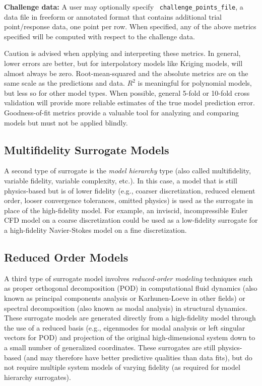 {\bf Challenge data:} A user may optionally specify {\tt
  challenge\_points\_file}, a data file in freeform or annotated
format that contains additional trial point/response data, one point
per row.  When specified, any of the above metrics specified will be
computed with respect to the challenge data.

Caution is advised when applying and interpreting these metrics.  In
general, lower errors are better, but for interpolatory models like
Kriging models, will almost always be zero.  Root-mean-squared and the
absolute metrics are on the same scale as the predictions and data.
$R^2$ is meaningful for polynomial models, but less so for other model
types.  When possible, general 5-fold or 10-fold cross validation will
provide more reliable estimates of the true model prediction
error. Goodness-of-fit metrics provide a valuable tool for analyzing
and comparing models but must not be applied blindly.


\subsection{Multifidelity Surrogate Models} \label{models:surrogate:multifid}

A second type of surrogate is the {\em model hierarchy} type (also
called multifidelity, variable fidelity, variable complexity, etc.).
In this case, a model that is still physics-based but is of lower
fidelity (e.g., coarser discretization, reduced element order, looser
convergence tolerances, omitted physics) is used as the surrogate in
place of the high-fidelity model.  For example, an inviscid,
incompressible Euler CFD model on a coarse discretization could be
used as a low-fidelity surrogate for a high-fidelity Navier-Stokes
model on a fine discretization.

\subsection{Reduced Order Models} \label{models:surrogate:rom}

A third type of surrogate model involves {\em reduced-order modeling}
techniques such as proper orthogonal decomposition (POD) in
computational fluid dynamics (also known as principal components
analysis or Karhunen-Loeve in other fields) or spectral decomposition
(also known as modal analysis) in structural dynamics.  These
surrogate models are generated directly from a high-fidelity model
through the use of a reduced basis (e.g., eigenmodes for modal
analysis or left singular vectors for POD) and projection of the
original high-dimensional system down to a small number of generalized
coordinates.  These surrogates are still physics-based (and may
therefore have better predictive qualities than data fits), but do not
require multiple system models of varying fidelity (as required for
model hierarchy surrogates).

